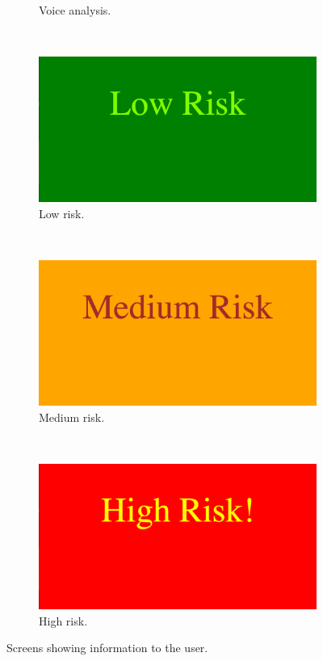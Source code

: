\documentclass[main.tex]{subfiles}
\begin{document}
\begin{figure}[htb]
\begin{subfigure}{0.45\textwidth}
				\caption{Voice analysis.}
				\label{fig:state4}
		\end{subfigure}
		~
		\begin{subfigure}{0.45\textwidth}
				\includegraphics[width=\textwidth]{pics/state6}
				\caption{Low risk.}
				\label{fig:state6}
		\end{subfigure}
		\\
		\begin{subfigure}{0.45\textwidth}
				\includegraphics[width=\textwidth]{pics/state7}
				\caption{Medium risk.}
				\label{fig:state7}
		\end{subfigure}
		~
		\begin{subfigure}{0.45\textwidth}
				\includegraphics[width=\textwidth]{pics/state8}
				\caption{High risk.}
				\label{fig:state8}
		\end{subfigure}
	\caption{Screens showing information to the user.}
	\label{fig:states}
\end{figure}
\end{document}
